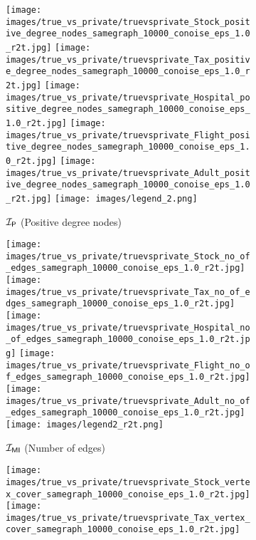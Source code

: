 \begin{figure*}
    \begin{subfigure}[b]{\textwidth}
         \centering
         \texttt{[image: images/true\_vs\_private/truevsprivate\_Stock\_positive\_degree\_nodes\_samegraph\_10000\_conoise\_eps\_1.0\_r2t.jpg]}
         \hfill
         \texttt{[image: images/true\_vs\_private/truevsprivate\_Tax\_positive\_degree\_nodes\_samegraph\_10000\_conoise\_eps\_1.0\_r2t.jpg]}
         \hfill
         \texttt{[image: images/true\_vs\_private/truevsprivate\_Hospital\_positive\_degree\_nodes\_samegraph\_10000\_conoise\_eps\_1.0\_r2t.jpg]}
         \hfill
         \texttt{[image: images/true\_vs\_private/truevsprivate\_Flight\_positive\_degree\_nodes\_samegraph\_10000\_conoise\_eps\_1.0\_r2t.jpg]}
         \hfill
         \texttt{[image: images/true\_vs\_private/truevsprivate\_Adult\_positive\_degree\_nodes\_samegraph\_10000\_conoise\_eps\_1.0\_r2t.jpg]}
         \texttt{[image: images/legend\_2.png]}
         \caption{$\mathcal{I_\mathsf{P}}$ (Positive degree nodes)}
         \label{fig:tp_conoise_pdedges}
     \end{subfigure}
    \begin{subfigure}[b]{\textwidth}
         \centering
         \texttt{[image: images/true\_vs\_private/truevsprivate\_Stock\_no\_of\_edges\_samegraph\_10000\_conoise\_eps\_1.0\_r2t.jpg]}
         \hfill
         \texttt{[image: images/true\_vs\_private/truevsprivate\_Tax\_no\_of\_edges\_samegraph\_10000\_conoise\_eps\_1.0\_r2t.jpg]}
         \hfill
         \texttt{[image: images/true\_vs\_private/truevsprivate\_Hospital\_no\_of\_edges\_samegraph\_10000\_conoise\_eps\_1.0\_r2t.jpg]}
         \hfill
         \texttt{[image: images/true\_vs\_private/truevsprivate\_Flight\_no\_of\_edges\_samegraph\_10000\_conoise\_eps\_1.0\_r2t.jpg]}
         \hfill
         \texttt{[image: images/true\_vs\_private/truevsprivate\_Adult\_no\_of\_edges\_samegraph\_10000\_conoise\_eps\_1.0\_r2t.jpg]}
         \texttt{[image: images/legend2\_r2t.png]}
         \caption{$\mathcal{I_{\mathsf{MI}}}$ (Number of edges)}
         \label{fig:tp_conoise_nedges}
     \end{subfigure}
     \begin{subfigure}[b]{\textwidth}
    \centering
    \texttt{[image: images/true\_vs\_private/truevsprivate\_Stock\_vertex\_cover\_samegraph\_10000\_conoise\_eps\_1.0\_r2t.jpg]}
    \hfill
    \texttt{[image: images/true\_vs\_private/truevsprivate\_Tax\_vertex\_cover\_samegraph\_10000\_conoise\_eps\_1.0\_r2t.jpg]}

\end{subfigure}
\end{figure*}
